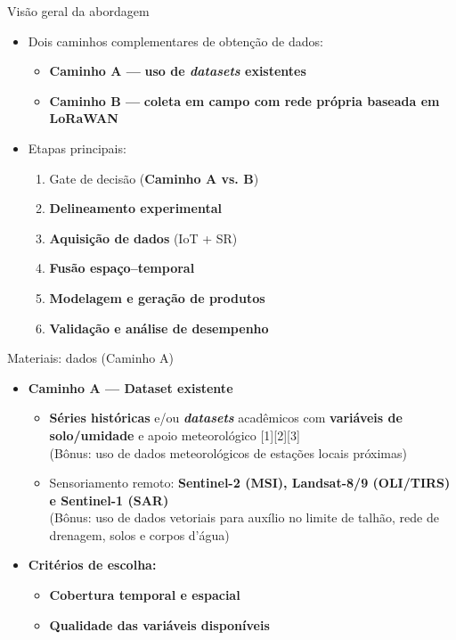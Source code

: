 \documentclass[aspectratio=169]{beamer}
\begin{document}
\begin{frame}{Visão geral da abordagem}
  \begin{itemize}
    \item Dois caminhos complementares de obtenção de dados:
      \begin{itemize}
        \item \textbf{Caminho A ---} \textbf{uso de \emph{datasets} existentes}
        \item \textbf{Caminho B ---} \textbf{coleta em campo com rede própria baseada em LoRaWAN}
      \end{itemize}
    \item Etapas principais:
      \begin{enumerate}
        \item Gate de decisão (\textbf{Caminho A vs. B})
        \item \textbf{Delineamento experimental}
        \item \textbf{Aquisição de dados} (IoT + SR)
        \item \textbf{Fusão espaço--temporal}
        \item \textbf{Modelagem e geração de produtos}
        \item \textbf{Validação e análise de desempenho}
      \end{enumerate}
  \end{itemize}
\end{frame}

\begin{frame}{Materiais: dados (Caminho A)}
  \begin{itemize}
    \item \textbf{Caminho A --- Dataset existente}
      \begin{itemize}
        \item \textbf{Séries históricas} e/ou \textbf{\emph{datasets}} acadêmicos com \textbf{variáveis de solo/umidade}
              e apoio meteorológico [1][2][3]
        \\{\scriptsize (Bônus: uso de dados meteorológicos de estações locais próximas)}
        \item Sensoriamento remoto: \textbf{Sentinel-2 (MSI), Landsat-8/9 (OLI/TIRS) e Sentinel-1 (SAR)}
        \\{\scriptsize (Bônus: uso de dados vetoriais para auxílio no limite de talhão, rede de drenagem, solos e corpos d'água)}
      \end{itemize}
    \item \textbf{Critérios de escolha:}
      \begin{itemize}
        \item \textbf{Cobertura temporal e espacial}
        \item \textbf{Qualidade das variáveis disponíveis}
      \end{itemize}
  \end{itemize}
\end{frame}
\end{document}
